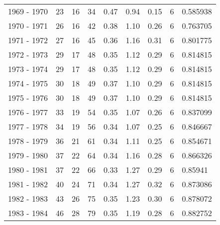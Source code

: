 \begin{tabular}{lrrrrrrrl}
1969 - 1970 &                      23 &          16 &       34 &        0.47 &        0.94 &        0.15 &           6 &   0.585938 \\
1970 - 1971 &                      26 &          16 &       42 &        0.38 &        1.10 &        0.26 &           6 &   0.763705 \\
1971 - 1972 &                      27 &          16 &       45 &        0.36 &        1.16 &        0.31 &           6 &   0.801775 \\
1972 - 1973 &                      29 &          17 &       48 &        0.35 &        1.12 &        0.29 &           6 &   0.814815 \\
1973 - 1974 &                      29 &          17 &       48 &        0.35 &        1.12 &        0.29 &           6 &   0.814815 \\
1974 - 1975 &                      30 &          18 &       49 &        0.37 &        1.10 &        0.29 &           6 &   0.814815 \\
1975 - 1976 &                      30 &          18 &       49 &        0.37 &        1.10 &        0.29 &           6 &   0.814815 \\
1976 - 1977 &                      33 &          19 &       54 &        0.35 &        1.07 &        0.26 &           6 &   0.837099 \\
1977 - 1978 &                      34 &          19 &       56 &        0.34 &        1.07 &        0.25 &           6 &   0.846667 \\
1978 - 1979 &                      36 &          21 &       61 &        0.34 &        1.11 &        0.25 &           6 &   0.854671 \\
1979 - 1980 &                      37 &          22 &       64 &        0.34 &        1.16 &        0.28 &           6 &   0.866326 \\
1980 - 1981 &                      37 &          22 &       66 &        0.33 &        1.27 &        0.29 &           6 &    0.85941 \\
1981 - 1982 &                      40 &          24 &       71 &        0.34 &        1.27 &        0.32 &           6 &   0.873086 \\
1982 - 1983 &                      43 &          26 &       75 &        0.35 &        1.23 &        0.30 &           6 &   0.878072 \\
1983 - 1984 &                      46 &          28 &       79 &        0.35 &        1.19 &        0.28 &           6 &   0.882752 \\

\end{tabular}
